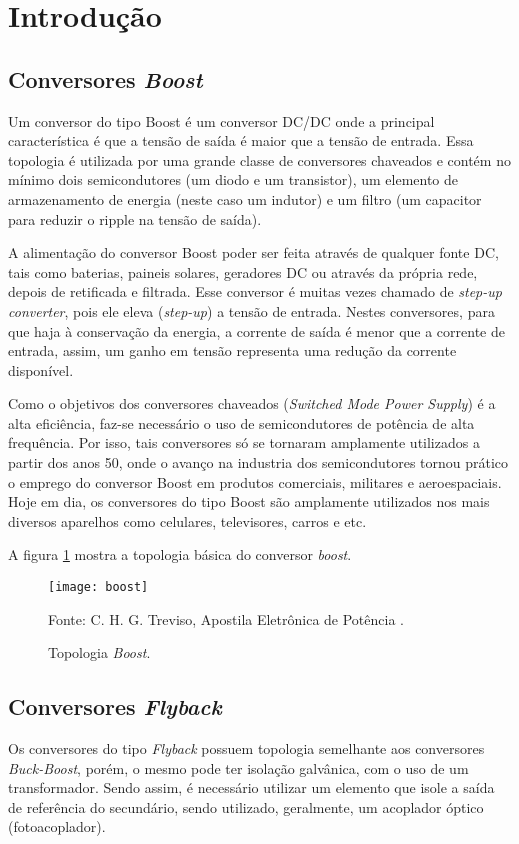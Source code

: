 \newpage
\section{Introdução}

\subsection{Conversores \textit{Boost}}
Um conversor do tipo Boost é um conversor DC/DC onde a principal característica é que a tensão de saída é maior que a tensão de entrada. Essa topologia é utilizada por uma grande classe de conversores chaveados e contém no mínimo dois semicondutores (um diodo e um transistor), um elemento de armazenamento de energia (neste caso um indutor) e um filtro (um capacitor para reduzir o ripple na tensão de saída).

A alimentação do conversor Boost poder ser feita através de qualquer fonte DC, tais como baterias, paineis solares, geradores DC ou através da própria rede, depois de retificada e filtrada.
Esse conversor é muitas vezes chamado de \textit{step-up converter}, pois ele eleva (\textit{step-up}) a tensão de entrada. Nestes conversores, para que haja à conservação da energia, a corrente de saída é menor que a corrente de entrada, assim, um ganho em tensão representa uma redução da corrente disponível.

Como o objetivos dos conversores chaveados (\textit{Switched Mode Power Supply}) é a alta eficiência, faz-se necessário o uso de semicondutores de potência de alta frequência. Por isso, tais conversores só se tornaram amplamente utilizados a partir dos anos 50, onde o avanço na industria dos semicondutores tornou prático o emprego do conversor Boost em produtos comerciais, militares e  aeroespaciais. Hoje em dia, os conversores do tipo Boost são amplamente utilizados nos mais diversos aparelhos como celulares, televisores, carros e etc. 

A figura \ref{fig:boost} mostra a topologia básica do conversor \textit{boost}.

\begin{figure}[H]
  \centering
  \caption{Topologia \textit{Boost}.}
  \texttt{[image: boost]}
  \label{fig:boost}
  
  \small Fonte: C. H. G. Treviso, Apostila Eletrônica de Potência \cite{apostila}.
\end{figure}

\subsection{Conversores \textit{Flyback}}
Os conversores do tipo \textit{Flyback} possuem topologia semelhante aos conversores \textit{Buck-Boost}, porém, o mesmo pode ter isolação galvânica, com o uso de um transformador. Sendo assim, é necessário utilizar um elemento que isole a saída de referência do secundário, sendo utilizado, geralmente, um acoplador óptico (fotoacoplador).

